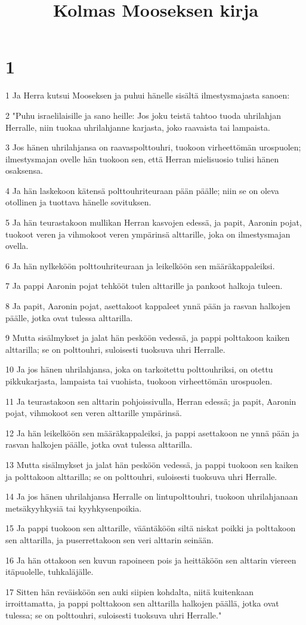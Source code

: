 

\title{Kolmas Mooseksen kirja}


\chapter{1}

\par 1 Ja Herra kutsui Mooseksen ja puhui hänelle sisältä ilmestysmajasta sanoen:
\par 2 "Puhu israelilaisille ja sano heille: Jos joku teistä tahtoo tuoda uhrilahjan Herralle, niin tuokaa uhrilahjanne karjasta, joko raavaista tai lampaista.
\par 3 Jos hänen uhrilahjansa on raavaspolttouhri, tuokoon virheettömän urospuolen; ilmestysmajan ovelle hän tuokoon sen, että Herran mielisuosio tulisi hänen osaksensa.
\par 4 Ja hän laskekoon kätensä polttouhriteuraan pään päälle; niin se on oleva otollinen ja tuottava hänelle sovituksen.
\par 5 Ja hän teurastakoon mullikan Herran kasvojen edessä, ja papit, Aaronin pojat, tuokoot veren ja vihmokoot veren ympärinsä alttarille, joka on ilmestysmajan ovella.
\par 6 Ja hän nylkeköön polttouhriteuraan ja leikelköön sen määräkappaleiksi.
\par 7 Ja pappi Aaronin pojat tehkööt tulen alttarille ja pankoot halkoja tuleen.
\par 8 Ja papit, Aaronin pojat, asettakoot kappaleet ynnä pään ja rasvan halkojen päälle, jotka ovat tulessa alttarilla.
\par 9 Mutta sisälmykset ja jalat hän pesköön vedessä, ja pappi polttakoon kaiken alttarilla; se on polttouhri, suloisesti tuoksuva uhri Herralle.
\par 10 Ja jos hänen uhrilahjansa, joka on tarkoitettu polttouhriksi, on otettu pikkukarjasta, lampaista tai vuohista, tuokoon virheettömän urospuolen.
\par 11 Ja teurastakoon sen alttarin pohjoissivulla, Herran edessä; ja papit, Aaronin pojat, vihmokoot sen veren alttarille ympärinsä.
\par 12 Ja hän leikelköön sen määräkappaleiksi, ja pappi asettakoon ne ynnä pään ja rasvan halkojen päälle, jotka ovat tulessa alttarilla.
\par 13 Mutta sisälmykset ja jalat hän pesköön vedessä, ja pappi tuokoon sen kaiken ja polttakoon alttarilla; se on polttouhri, suloisesti tuoksuva uhri Herralle.
\par 14 Ja jos hänen uhrilahjansa Herralle on lintupolttouhri, tuokoon uhrilahjanaan metsäkyyhkysiä tai kyyhkysenpoikia.
\par 15 Ja pappi tuokoon sen alttarille, vääntäköön siltä niskat poikki ja polttakoon sen alttarilla, ja puserrettakoon sen veri alttarin seinään.
\par 16 Ja hän ottakoon sen kuvun rapoineen pois ja heittäköön sen alttarin viereen itäpuolelle, tuhkaläjälle.
\par 17 Sitten hän reväisköön sen auki siipien kohdalta, niitä kuitenkaan irroittamatta, ja pappi polttakoon sen alttarilla halkojen päällä, jotka ovat tulessa; se on polttouhri, suloisesti tuoksuva uhri Herralle."

